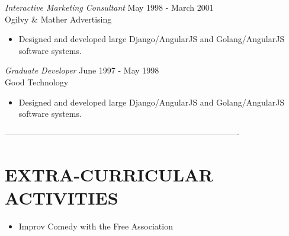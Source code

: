 \documentclass[margin, 10pt]{res} %
\begin{document}
\begin{resume}
        {\sl Interactive Marketing Consultant} \hfill May 1998 - March 2001\\
        Ogilvy \& Mather Advertising
        \begin{itemize}
            \item Designed and developed large Django/AngularJS and Golang/AngularJS software systems.
        \end{itemize}

        {\sl Graduate Developer} \hfill June 1997 - May 1998\\
        Good Technology
        \begin{itemize}
            \item Designed and developed large Django/AngularJS and Golang/AngularJS software systems.
        \end{itemize}
        -------------------------------------------------------------------------------------

        \section{EXTRA-CURRICULAR \\ ACTIVITIES}


        \begin{itemize}
            \item Improv Comedy with the Free Association
        \end{itemize}


    \end{resume}
\end{document}
